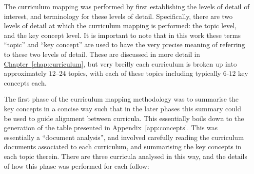\documentclass[twoside,12pt,a4paper]{report}
\newcommand{\refchap}[1]{\hyperref[chap:#1]{Chapter~\ref{chap:#1}}}
\newcommand{\refapp}[1]{\hyperref[app:#1]{Appendix~\ref{app:#1}}}
\begin{document}
The curriculum mapping was performed by first establishing the levels of detail of interest, and terminology for these levels of detail. Specifically, there are two levels of detail at which the curriculum mapping is performed: the topic level, and the key concept level. It is important to note that in this work these terms ``topic'' and ``key concept'' are used to have the very precise meaning of referring to these two levels of detail. These are discussed in more detail in \refchap{curriculum}, but very breifly each curriculum is broken up into approximately $12$--$24$ topics, with each of these topics including typically $6$-$12$ key concepts each. 

The first phase of the curriculum mapping methodology was to summarise the key concepts in a concise way such that in the later phases this summary could be used to guide alignment between curricula. This essentially boils down to the generation of the table presented in \refapp{concepts}. This was essentially a ``document analysis'', and involved carefully reading the curriculum documents associated to each curriculum, and summarising the key concepts in each topic therein. There are three curricula analysed in this way, and the details of how this phase was performed for each follow:
\end{document}
